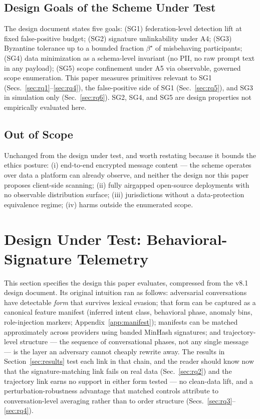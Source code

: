 \documentclass[11pt]{article}
\begin{document}
\subsection{Design Goals of the Scheme Under Test}
The design document states five goals: (SG1) federation-level detection lift at fixed false-positive budget; (SG2) signature unlinkability under A4; (SG3) Byzantine tolerance up to a bounded fraction $\beta^\star$ of misbehaving participants; (SG4) data minimization as a schema-level invariant (no PII, no raw prompt text in any payload); (SG5) scope confinement under A5 via observable, governed scope enumeration. This paper measures primitives relevant to SG1 (Secs.~\ref{sec:rq1}--\ref{sec:rq4}), the false-positive side of SG1 (Sec.~\ref{sec:rq5}), and SG3 in simulation only (Sec.~\ref{sec:rq6}). SG2, SG4, and SG5 are design properties not empirically evaluated here.

\subsection{Out of Scope}
\label{sec:oos}
Unchanged from the design under test, and worth restating because it bounds the ethics posture: (i) end-to-end encrypted message content --- the scheme operates over data a platform can already observe, and neither the design nor this paper proposes client-side scanning; (ii) fully airgapped open-source deployments with no observable distribution surface; (iii) jurisdictions without a data-protection equivalence regime; (iv) harms outside the enumerated scope.

\section{Design Under Test: Behavioral-Signature Telemetry}
\label{sec:design}

This section specifies the design this paper evaluates, compressed from the v8.1 design document. Its original intuition ran as follows: adversarial conversations have detectable \emph{form} that survives lexical evasion; that form can be captured as a canonical feature manifest (inferred intent class, behavioral phase, anomaly bins, role-injection markers; Appendix~\ref{app:manifest}); manifests can be matched approximately across providers using banded MinHash signatures; and trajectory-level structure --- the sequence of conversational phases, not any single message --- is the layer an adversary cannot cheaply rewrite away. The results in Section~\ref{sec:results} test each link in that chain, and the reader should know now that the signature-matching link fails on real data (Sec.~\ref{sec:rq2}) and the trajectory link earns no support in either form tested --- no clean-data lift, and a perturbation-robustness advantage that matched controls attribute to conversation-level averaging rather than to order structure (Secs.~\ref{sec:rq3}--\ref{sec:rq4}).
\end{document}
